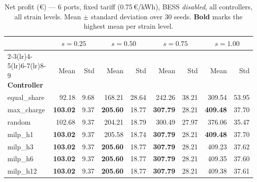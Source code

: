\begin{table}[!htb]
\centering
\caption{Net profit (€) — 6 ports, fixed tariff (0.75\,€/kWh),
         BESS \emph{disabled}, all controllers, all strain levels.
         Mean $\pm$ standard deviation over 30 seeds.
         \textbf{Bold} marks the highest mean per strain level.}
\label{tab:gc_fixed_nobess_ms_6p}
\setlength{\tabcolsep}{4.5pt}
\begin{tabular}{l rr rr rr rr}
\toprule
 & \multicolumn{2}{c}{$s=0.25$}
 & \multicolumn{2}{c}{$s=0.50$}
 & \multicolumn{2}{c}{$s=0.75$}
 & \multicolumn{2}{c}{$s=1.00$} \\
\cmidrule(lr){2-3}\cmidrule(lr){4-5}\cmidrule(lr){6-7}\cmidrule(lr){8-9}
\textbf{Controller} & Mean & Std & Mean & Std & Mean & Std & Mean & Std \\
\midrule
equal\_share &  92.18 &  9.68 & 168.21 & 28.64 & 242.26 & 38.21 & 309.54 & 53.95 \\
max\_charge  & \textbf{103.02} &  9.37 & \textbf{205.60} & 18.77 & \textbf{307.79} & 28.21 & \textbf{409.48} & 37.70 \\
random       & 102.68 &  9.37 & 204.21 & 18.79 & 300.49 & 27.97 & 376.06 & 35.47 \\
milp\_h1     & \textbf{103.02} &  9.37 & 205.58 & 18.74 & \textbf{307.79} & 28.21 & \textbf{409.48} & 37.70 \\
milp\_h3     & \textbf{103.02} &  9.37 & \textbf{205.60} & 18.77 & \textbf{307.79} & 28.21 & 409.23 & 37.62 \\
milp\_h6     & \textbf{103.02} &  9.37 & \textbf{205.60} & 18.77 & \textbf{307.79} & 28.21 & 409.35 & 37.60 \\
milp\_h12    & \textbf{103.02} &  9.37 & \textbf{205.60} & 18.77 & \textbf{307.79} & 28.21 & 409.38 & 37.61 \\
\bottomrule
\end{tabular}
\end{table}

